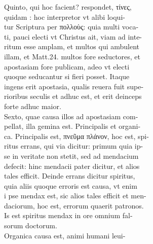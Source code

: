 \documentclass{article}
\begin{document}
\begin{pages}
                Quinto, qui hoc facient? respondet, τίνες, \\
                quidam : hoc interpretor vt alibi loqui- \\
                tur Scriptura per πολλοὺς: quia multi voca- \\
                ti, pauci electi vt Christus ait, viam ad inte- \\
                ritum esse amplam, et multos qui ambulent \\
                illam, et Matt.24. multos fore seductores, et \\
                apostasiam fore publicam, adeo vt electi \\
                quoque seducantur si fieri posset. Itaque \\
                ingens erit apostasia, qualis reuera fuit supe- \\
                rioribus seculis et adhuc est, et erit deinceps \\
                forte adhuc maior. \\
                Sexto, quae causa illos ad apostasiam com- \\
                pellat, illa gemina est. Principalis et organi- \\
                ca. Principalis est, πνεῦμα πλάνον, hoc est, spi- \\
                ritus errans, qui via dicitur: primum quia ip- \\
                se in veritate non stetit, sed ad mendacium \\
                defecit: hinc mendacii pater dicitur, et alios \\
                tales efficit. Deinde errans dicitur spiritus, \\
                quia aliis quoque erroris est causa, vt enim \\
                i pse mendax est, sic alios tales efficit et men- \\
                daciorum, hoc est, errorum quaerit patronos. \\
                Is est spiritus mendax in ore omnium fal- \\
                sorum doctorum. \\
                Organica causa est, animi humani leui- \\

\end{pages}
\end{document}
